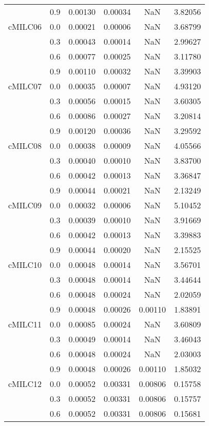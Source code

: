 \begin{longtable}{cccccc}
        & 0.9 & 0.00130 & 0.00034 & NaN & 3.82056 \\
cMILC06 & 0.0 & 0.00021 & 0.00006 & NaN & 3.68799 \\
        & 0.3 & 0.00043 & 0.00014 & NaN & 2.99627 \\
        & 0.6 & 0.00077 & 0.00025 & NaN & 3.11780 \\
        & 0.9 & 0.00110 & 0.00032 & NaN & 3.39903 \\
cMILC07 & 0.0 & 0.00035 & 0.00007 & NaN & 4.93120 \\
        & 0.3 & 0.00056 & 0.00015 & NaN & 3.60305 \\
        & 0.6 & 0.00086 & 0.00027 & NaN & 3.20814 \\
        & 0.9 & 0.00120 & 0.00036 & NaN & 3.29592 \\
cMILC08 & 0.0 & 0.00038 & 0.00009 & NaN & 4.05566 \\
        & 0.3 & 0.00040 & 0.00010 & NaN & 3.83700 \\
        & 0.6 & 0.00042 & 0.00013 & NaN & 3.36847 \\
        & 0.9 & 0.00044 & 0.00021 & NaN & 2.13249 \\
cMILC09 & 0.0 & 0.00032 & 0.00006 & NaN & 5.10452 \\
        & 0.3 & 0.00039 & 0.00010 & NaN & 3.91669 \\
        & 0.6 & 0.00042 & 0.00013 & NaN & 3.39883 \\
        & 0.9 & 0.00044 & 0.00020 & NaN & 2.15525 \\
cMILC10 & 0.0 & 0.00048 & 0.00014 & NaN & 3.56701 \\
        & 0.3 & 0.00048 & 0.00014 & NaN & 3.44644 \\
        & 0.6 & 0.00048 & 0.00024 & NaN & 2.02059 \\
        & 0.9 & 0.00048 & 0.00026 & 0.00110 & 1.83891 \\
cMILC11 & 0.0 & 0.00085 & 0.00024 & NaN & 3.60809 \\
        & 0.3 & 0.00049 & 0.00014 & NaN & 3.46043 \\
        & 0.6 & 0.00048 & 0.00024 & NaN & 2.03003 \\
        & 0.9 & 0.00048 & 0.00026 & 0.00110 & 1.85032 \\
cMILC12 & 0.0 & 0.00052 & 0.00331 & 0.00806 & 0.15758 \\
        & 0.3 & 0.00052 & 0.00331 & 0.00806 & 0.15757 \\
        & 0.6 & 0.00052 & 0.00331 & 0.00806 & 0.15681 \\

\end{longtable}
